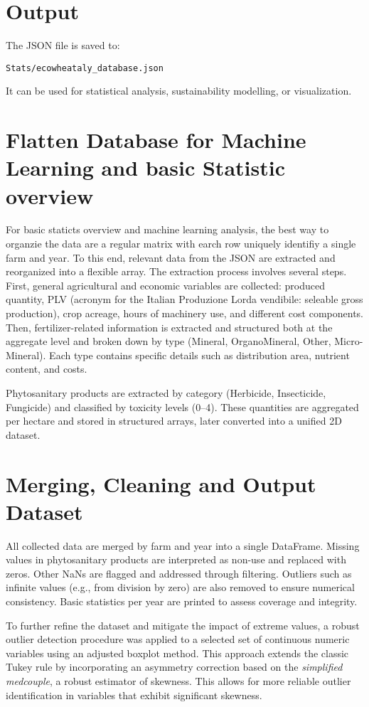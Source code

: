 \documentclass[11pt,a4paper]{article}
\begin{document}
\section*{Output}
The JSON file is saved to:
\begin{verbatim}
Stats/ecowheataly_database.json
\end{verbatim}
It can be used for statistical analysis, sustainability modelling, or visualization.


\section{Flatten Database for Machine Learning and basic Statistic overview}

For basic staticts overview and machine learning analysis, the best way to organzie the data are a regular matrix with earch row uniquely identifiy a single farm and year.
To this end, relevant data from the JSON are extracted and reorganized into a flexible array.
The extraction process involves several steps. First, general agricultural and economic variables are collected: produced quantity, PLV (acronym for the Italian Produzione Lorda vendibile: seleable gross production), crop acreage, hours of machinery use, and different cost components. Then, fertilizer-related information is extracted and structured both at the aggregate level and broken down by type (Mineral, OrganoMineral, Other, Micro-Mineral). Each type contains specific details such as distribution area, nutrient content, and costs.

Phytosanitary products are extracted by category (Herbicide, Insecticide, Fungicide) and classified by toxicity levels (0–4). These quantities are aggregated per hectare and stored in structured arrays, later converted into a unified 2D dataset.

\section{Merging, Cleaning and Output Dataset}

All collected data are merged by farm and year into a single DataFrame. Missing values in phytosanitary products are interpreted as non-use and replaced with zeros. Other NaNs are flagged and addressed through filtering. Outliers such as infinite values (e.g., from division by zero) are also removed to ensure numerical consistency. Basic statistics per year are printed to assess coverage and integrity.

To further refine the dataset and mitigate the impact of extreme values, a robust outlier detection procedure was applied to a selected set of continuous numeric variables using an adjusted boxplot method. This approach extends the classic Tukey rule by incorporating an asymmetry correction based on the \textit{simplified medcouple}, a robust estimator of skewness. This allows for more reliable outlier identification in variables that exhibit significant skewness.
\end{document}
